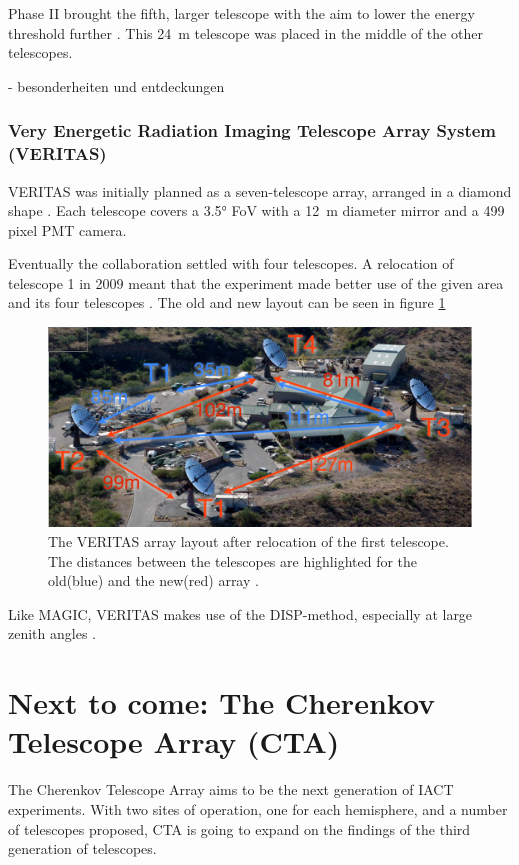 Phase II brought the fifth, larger telescope with the aim to lower the energy threshold
further \cite{vincent2005hess}. This \SI{24}{\meter} telescope was placed in the middle of the other
telescopes.

- besonderheiten und entdeckungen

\subsubsection{Very Energetic Radiation Imaging Telescope Array System (VERITAS)}
VERITAS	was initially planned as a seven-telescope array, arranged in a diamond shape
\cite{WEEKES2002221}.
Each telescope covers a 3.5° FoV with a \SI{12}{\meter} diameter mirror and 
a 499 pixel PMT camera.


Eventually the collaboration settled 
with four telescopes. A relocation of telescope 1 in 2009 meant that the 
experiment made better use of the given area and its four telescopes \cite{2009arXiv0912.3841P}.
The old and new layout can be seen in figure \ref{fig:veritas_relocation}

\begin{figure}
	\center
	\includegraphics[width=.8\textwidth]{images/veritas_relocation.png}
	\caption{The VERITAS array layout after relocation of the first 
		telescope. The distances between the telescopes are 
	highlighted for the old(blue) and the new(red) array \cite{2009arXiv0912.3841P}.}
	\label{fig:veritas_relocation}
\end{figure}

Like MAGIC, VERITAS makes use of the DISP-method, especially at large zenith angles 
\cite{2015ICRC...34..771P}.



\section{Next to come: The Cherenkov Telescope Array (CTA)}
The Cherenkov Telescope Array aims to be the next generation of IACT experiments.
With two sites of operation, one for each hemisphere, and a number of 
telescopes proposed, CTA is going to expand on the findings of the third 
generation of telescopes.

